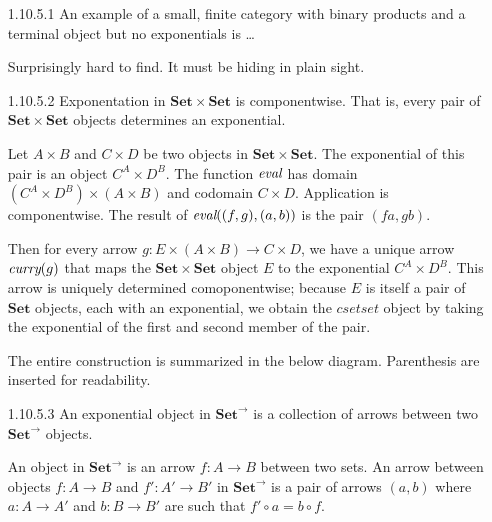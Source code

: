 \documentclass{article}
\newcommand{\curry}[1]{\emph{curry}(#1)}
\newcommand{\eval}{\emph{eval}}
\newcommand{\cset}{\mathbf{Set}}
\newcommand{\cseta}{\mathbf{Set}^{\rightarrow}}
\newcommand{\csetset}{\cset \times \cset}
\begin{document}
\begin{enumerate}
\item [1.10.5.1]
  An example of a small, finite category with binary products and a terminal object but no exponentials is \ldots

  Surprisingly hard to find.
  It must be hiding in plain sight.

\item [1.10.5.2]
  Exponentation in $\csetset$ is componentwise.
  That is, every pair of $\csetset$ objects determines an exponential.
  
  Let $A \times B$ and $C \times D$ be two objects in $\csetset$.
  The exponential of this pair is an object $C^A \times D^B$.
  The function $\eval$  has domain $(C^A \times D^B) \times (A \times B)$ and codomain $C \times D$.
  Application is componentwise.
  The result of $\eval((f, g), (a,b))$ is the pair $(f a, g b)$.

  Then for every arrow $g : E \times (A \times B) \rightarrow C \times D$, we have a unique arrow $\curry{g}$ that maps the $\csetset$ object $E$ to the exponential $C^A \times D^B$.
  This arrow is uniquely determined comoponentwise; because $E$ is itself a pair of $\cset$ objects, each with an exponential, we obtain the $csetset$ object by taking the exponential of the first and second member of the pair.
  
  The entire construction is summarized in the below diagram.
  Parenthesis are inserted for readability.
  \begin{center}
  \end{center}

\newpage
\item [1.10.5.3]
  An exponential object in $\cseta$ is a collection of arrows between two $\cseta$ objects.

  An object in $\cseta$ is an arrow $f: A \rightarrow B$ between two sets.
  An arrow between objects $f : A \rightarrow B$ and $f' : A' \rightarrow B'$ in $\cseta$ is a pair of arrows $(a,b)$ where $a : A \rightarrow A'$ and $b: B \rightarrow B'$ are such that $f' \circ a = b \circ f$.
  \begin{center}
\end{center}
\end{enumerate}
\end{document}
